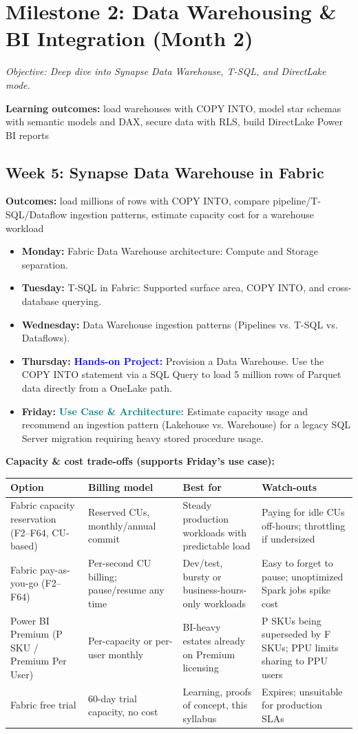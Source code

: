 \documentclass[11pt, a4paper]{article}
\newcommand{\project}[1]{\vspace{1mm}\noindent\textbf{\textcolor{blue}{Hands-on Project:}} #1}
\newcommand{\usecase}[1]{\vspace{1mm}\noindent\textbf{\textcolor{teal}{Use Case \& Architecture:}} #1}
\newcommand{\dayitem}[2]{\item \textbf{#1:} #2}
\begin{document}
\section{Milestone 2: Data Warehousing \& BI Integration (Month 2)}
\textit{Objective: Deep dive into Synapse Data Warehouse, T-SQL, and DirectLake mode.}
\par\noindent\textbf{Learning outcomes:} load warehouses with COPY INTO, model star schemas with semantic models and DAX, secure data with RLS, build DirectLake Power BI reports

\subsection*{Week 5: Synapse Data Warehouse in Fabric}
\par\noindent\textbf{Outcomes:} load millions of rows with COPY INTO, compare pipeline/T-SQL/Dataflow ingestion patterns, estimate capacity cost for a warehouse workload
\begin{itemize}[label=-]
    \dayitem{Monday}{Fabric Data Warehouse architecture: Compute and Storage separation.}
    \dayitem{Tuesday}{T-SQL in Fabric: Supported surface area, COPY INTO, and cross-database querying.}
    \dayitem{Wednesday}{Data Warehouse ingestion patterns (Pipelines vs. T-SQL vs. Dataflows).}
    \dayitem{Thursday}{\project{Provision a Data Warehouse. Use the COPY INTO statement via a SQL Query to load 5 million rows of Parquet data directly from a OneLake path.}}
    \dayitem{Friday}{\usecase{Estimate capacity usage and recommend an ingestion pattern (Lakehouse vs. Warehouse) for a legacy SQL Server migration requiring heavy stored procedure usage.}}
\end{itemize}

\noindent\textbf{Capacity \& cost trade-offs (supports Friday's use case):}
\begin{center}
\small
\begin{tabular}{@{} p{3.6cm} p{3.2cm} p{3.8cm} p{4.4cm} @{}}
\toprule
\textbf{Option} & \textbf{Billing model} & \textbf{Best for} & \textbf{Watch-outs} \\
\midrule
Fabric capacity reservation (F2--F64, CU-based) & Reserved CUs, monthly/annual commit & Steady production workloads with predictable load & Paying for idle CUs off-hours; throttling if undersized \\
Fabric pay-as-you-go (F2--F64) & Per-second CU billing; pause/resume any time & Dev/test, bursty or business-hours-only workloads & Easy to forget to pause; unoptimized Spark jobs spike cost \\
Power BI Premium (P SKU / Premium Per User) & Per-capacity or per-user monthly & BI-heavy estates already on Premium licensing & P SKUs being superseded by F SKUs; PPU limits sharing to PPU users \\
Fabric free trial & 60-day trial capacity, no cost & Learning, proofs of concept, this syllabus & Expires; unsuitable for production SLAs \\
\bottomrule
\end{tabular}
\end{center}
\end{document}

